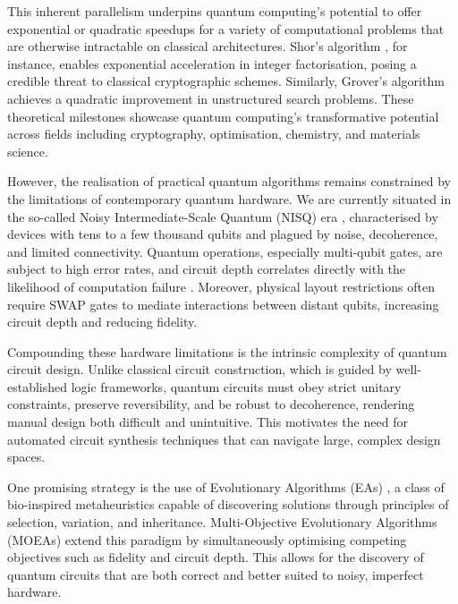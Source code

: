 \documentclass[11pt,a4paper]{article}
\begin{document}
This inherent parallelism underpins quantum computing’s potential to offer exponential or quadratic speedups for a variety of computational problems that are otherwise intractable on classical architectures. Shor’s algorithm \cite{Shor365700}, for instance, enables exponential acceleration in integer factorisation, posing a credible threat to classical cryptographic schemes. Similarly, Grover’s algorithm \cite{Khanal2021QuantumML} achieves a quadratic improvement in unstructured search problems. These theoretical milestones showcase quantum computing’s transformative potential across fields including cryptography, optimisation, chemistry, and materials science.\newline

However, the realisation of practical quantum algorithms remains constrained by the limitations of contemporary quantum hardware. We are currently situated in the so-called Noisy Intermediate-Scale Quantum (NISQ) era \cite{Preskill2018QuantumCI}, characterised by devices with tens to a few thousand qubits and plagued by noise, decoherence, and limited connectivity. Quantum operations, especially multi-qubit gates, are subject to high error rates, and circuit depth correlates directly with the likelihood of computation failure \cite{Clerk2008IntroductionTQ}. Moreover, physical layout restrictions often require SWAP gates to mediate interactions between distant qubits, increasing circuit depth and reducing fidelity.\newline

Compounding these hardware limitations is the intrinsic complexity of quantum circuit design. Unlike classical circuit construction, which is guided by well-established logic frameworks, quantum circuits must obey strict unitary constraints, preserve reversibility, and be robust to decoherence, rendering manual design both difficult and unintuitive. This motivates the need for automated circuit synthesis techniques that can navigate large, complex design spaces.\newline

One promising strategy is the use of Evolutionary Algorithms (EAs) \cite{Lukac2002EvolvingQC}, a class of bio-inspired metaheuristics capable of discovering solutions through principles of selection, variation, and inheritance. Multi-Objective Evolutionary Algorithms (MOEAs) \cite{moein} extend this paradigm by simultaneously optimising competing objectives such as fidelity and circuit depth. This allows for the discovery of quantum circuits that are both correct and better suited to noisy, imperfect hardware.\newline
\end{document}
